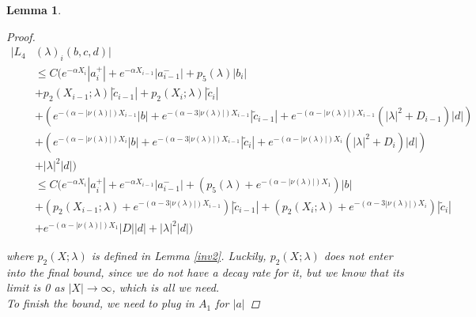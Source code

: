 \documentclass[12pt]{article}
\newtheorem{lemma}{Lemma}
\begin{document}
\begin{lemma}
\begin{proof}
\begin{align*}
|L_4&(\lambda)_i(b, c, d)|\\
&\leq C \Big( e^{-\alpha X_i} |a_i^+| +  e^{-\alpha X_{i-1}} |a_{i-1}^-| + p_5(\lambda) |b_i| \\
&+ p_2(X_{i-1}; \lambda) |\tilde{c}_{i-1}| + p_2(X_i; \lambda) |\tilde{c}_i| \\
&+ ( e^{-(\alpha - |\nu(\lambda)|) X_{i-1}} |b| + e^{-(\alpha - 3 |\nu(\lambda)|) X_{i-1}}|\tilde{c}_{i-1}| + e^{-(\alpha - |\nu(\lambda)|) X_{i-1}} (|\lambda|^2 + D_{i-1})|d| ) \\
&+ ( e^{-(\alpha - |\nu(\lambda)|) X_i} |b| + e^{-(\alpha - 3 |\nu(\lambda)|) X_{i-1}}|\tilde{c}_i| + e^{-(\alpha - |\nu(\lambda)|) X_i} (|\lambda|^2 + D_i)|d| )  \\
&+ |\lambda|^2 |d| \Big)\\
&\leq C \Big( e^{-\alpha X_i} |a_i^+| +  e^{-\alpha X_{i-1}} |a_{i-1}^-| + (p_5(\lambda) + e^{-(\alpha - |\nu(\lambda)|) X_1}) |b| \\
&+ (p_2(X_{i-1}; \lambda) + e^{-(\alpha - 3 |\nu(\lambda)|) X_{i-1}}) |\tilde{c}_{i-1}| + (p_2(X_i; \lambda) + e^{-(\alpha - 3 |\nu(\lambda)|) X_i})|\tilde{c}_i| \\
&+ e^{-(\alpha - |\nu(\lambda)|) X_1} |D||d| + |\lambda|^2|d|
\Big)
\end{align*}

where $p_2(X; \lambda)$ is defined in Lemma \ref{inv2}. Luckily, $p_2(X; \lambda)$ does not enter into the final bound, since we do not have a decay rate for it, but we know that its limit is 0 as $|X| \rightarrow \infty$, which is all we need.\\

To finish the bound, we need to plug in $A_1$ for $|a|$


\end{proof}
\end{lemma}
\end{document}
